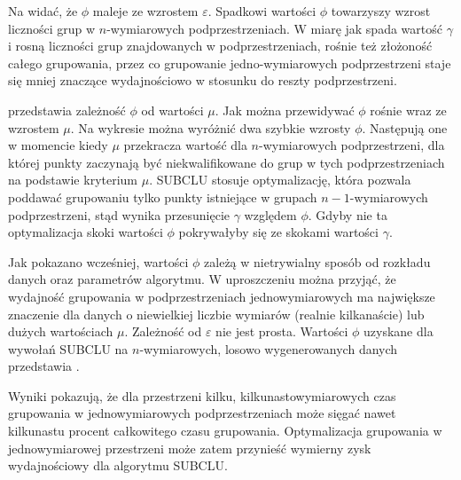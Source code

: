 

Na  widać, że $ \phi $ maleje ze wzrostem $ \varepsilon $. Spadkowi wartości $ \phi $ towarzyszy wzrost liczności grup w $ n $-wymiarowych podprzestrzeniach. W miarę jak spada wartość $ \gamma $ i rosną liczności grup znajdowanych w podprzestrzeniach, rośnie też złożoność całego grupowania, przez co grupowanie jedno-wymiarowych podprzestrzeni staje się mniej znaczące wydajnościowo w stosunku do reszty podprzestrzeni.\par

 przedstawia zależność $ \phi $ od wartości $ \mu $. Jak można przewidywać $ \phi $ rośnie wraz ze wzrostem $ \mu $. Na wykresie można wyróżnić dwa szybkie wzrosty $ \phi $. Następują one w momencie kiedy $ \mu $ przekracza wartość dla $ n $-wymiarowych podprzestrzeni, dla której punkty zaczynają być niekwalifikowane do grup w tych podprzestrzeniach na podstawie kryterium $ \mu $. SUBCLU stosuje optymalizację, która pozwala poddawać grupowaniu tylko punkty istniejące w grupach $ n-1 $-wymiarowych podprzestrzeni, stąd wynika przesunięcie $ \gamma $ względem $ \phi $. Gdyby nie ta optymalizacja skoki wartości $ \phi $ pokrywałyby się ze skokami wartości $ \gamma $.

Jak pokazano wcześniej, wartości $ \phi $ zależą w nietrywialny sposób od rozkładu danych oraz parametrów algorytmu. W uproszczeniu można przyjąć, że wydajność grupowania w podprzestrzeniach jednowymiarowych ma największe znaczenie dla danych o niewielkiej liczbie wymiarów (realnie kilkanaście) lub dużych wartościach $ \mu $. Zależność od $ \varepsilon $ nie jest prosta. Wartości $ \phi $ uzyskane dla wywołań SUBCLU na $ n $-wymiarowych, losowo wygenerowanych danych przedstawia .



Wyniki pokazują, że dla przestrzeni kilku, kilkunastowymiarowych czas grupowania w jednowymiarowych podprzestrzeniach może sięgać nawet kilkunastu procent całkowitego czasu grupowania. Optymalizacja grupowania w jednowymiarowej przestrzeni może zatem przynieść wymierny zysk wydajnościowy dla algorytmu SUBCLU. 

